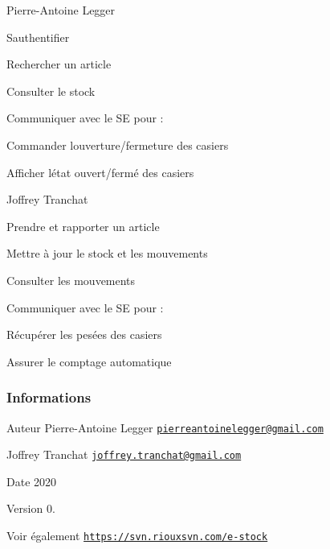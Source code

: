 \begin{DoxyItemize}
\item Pierre-\/\+Antoine Legger
\begin{DoxyItemize}
\item S\textquotesingle{}authentifier
\item Rechercher un article
\item Consulter le stock
\item Communiquer avec le SE pour \+:
\begin{DoxyItemize}
\item Commander l\textquotesingle{}ouverture/fermeture des casiers
\item Afficher l\textquotesingle{}état ouvert/fermé des casiers
\end{DoxyItemize}
\end{DoxyItemize}
\item Joffrey Tranchat
\begin{DoxyItemize}
\item Prendre et rapporter un article
\item Mettre à jour le stock et les mouvements
\item Consulter les mouvements
\item Communiquer avec le SE pour \+:
\item Récupérer les pesées des casiers
\item Assurer le comptage automatique
\end{DoxyItemize}
\end{DoxyItemize}\hypertarget{page__r_e_a_d_m_e_informations}{}\subsubsection{Informations}\label{page__r_e_a_d_m_e_informations}
\begin{DoxyAuthor}{Auteur}
Pierre-\/\+Antoine Legger \href{mailto:pierreantoinelegger@gmail.com}{\tt pierreantoinelegger@gmail.\+com} 

Joffrey Tranchat \href{mailto:joffrey.tranchat@gmail.com}{\tt joffrey.\+tranchat@gmail.\+com} 
\end{DoxyAuthor}
\begin{DoxyDate}{Date}
2020 
\end{DoxyDate}
\begin{DoxyVersion}{Version}
0. 
\end{DoxyVersion}
\begin{DoxySeeAlso}{Voir également}
\href{https://svn.riouxsvn.com/e-stock}{\tt https\+://svn.\+riouxsvn.\+com/e-\/stock} 
\end{DoxySeeAlso}
